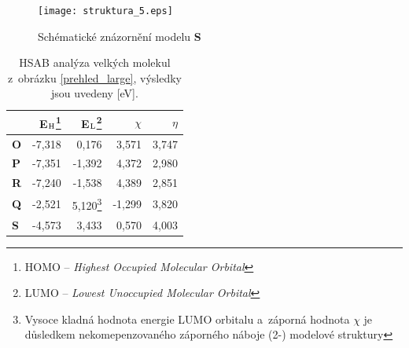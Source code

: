 \documentclass[
digital, %
table,   %
nolof,     %
nolot,     %
oneside,
]{fithesis3}
\begin{document}
\begin{figure}\begin{center}\texttt{[image: struktura\_5.eps]}
\caption{Schématické znázornění modelu \textbf{S}}\label{schema_5}
\end{center}\end{figure}

\begin{table}[H]
\begin{minipage}{\textwidth}
\caption{HSAB analýza velkých molekul z~obrázku \ref{prehled_large}, výsledky jsou uvedeny [eV].}
\begin{center}
\begin{tabular}{|l|r|r|r|r|}
\hline
\label{hsab_large} & E$_{\ce{H}}$\footnote{HOMO -- \textit{Highest Occupied Molecular Orbital}}  & E$_{\ce{L}}$\footnote{LUMO -- \textit{Lowest Unoccupied Molecular Orbital}} & $\chi$  & $\eta$  \\ \hline
\textbf{O} & -7,318 & 0,176 & 3,571 & 3,747 \\ \hline
\textbf{P} & -7,351 & -1,392 & 4,372 & 2,980 \\ \hline
\textbf{R} & -7,240 & -1,538 & 4,389 & 2,851 \\ \hline
\textbf{Q} & -2,521 & 5,120\footnote{Vysoce kladná hodnota energie LUMO orbitalu a~záporná hodnota $\chi$ je důsledkem nekomepenzovaného záporného náboje (2-) modelové struktury} & -1,299 & 3,820 \\ \hline
\textbf{S} & -4,573 & 3,433 & 0,570 & 4,003 \\ \hline
\end{tabular}
\end{center}
\end{minipage}
\end{table}
\end{document}
